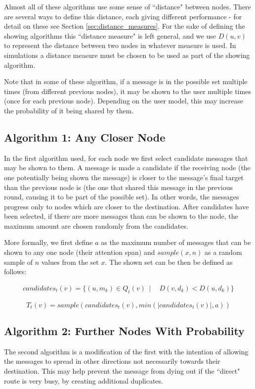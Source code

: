 \documentclass[bsc,frontabs,twoside,singlespacing,parskip,deptreport]{infthesis}     %
\begin{document}
Almost all of these algorithms use some sense of ``distance" between nodes. There are several ways to define this distance, each giving different performance - for detail on these see Section \ref{sec:distance_measures}. For the sake of defining the showing algorithms this ``distance measure" is left general, and we use $D(u, v)$ to represent the distance between two nodes in whatever measure is used. In simulations a distance measure must be chosen to be used as part of the showing algorithm.

Note that in some of these algorithm, if a message is in the possible set multiple times (from different previous nodes), it may be shown to the user multiple times (once for each previous node). Depending on the user model, this may increase the probability of it being shared by them.

\subsection{Algorithm 1: Any Closer Node}
In the first algorithm used, for each node we first select candidate messages that may be shown to them. A message is made a candidate if the receiving node (the one potentially being shown the message) is closer to the message's final target than the previous node is (the one that shared this message in the previous round, causing it to be part of the possible set). In other words, the messages progress only to nodes which are closer to the destination. After candidates have been selected, if there are more messages than can be shown to the node, the maximum amount are chosen randomly from the candidates. 

More formally, we first define $a$ as the maximum number of messages that can be shown to any one node (their attention span) and $sample(x, n)$ as a random sample of $n$ values from the set $x$. The shown set can be then be defined as follows:

\begin{equation}
\begin{split}
candidates_{t}(v) = \{ (u, m_{k}) \in Q_{t}(v) \:\: | \:\: & D(v, d_{k}) < D(u, d_{k}) \}
\end{split}
\end{equation}

\begin{equation}
T_{t}(v) = sample(candidates_{t}(v), min(|candidates_{t}(v)|, a))
\end{equation}

\subsection{Algorithm 2: Further Nodes With Probability}
The second algorithm is a modification of the first with the intention of allowing the messages to spread in other directions not necessarily towards their destination. This may help prevent the message from dying out if the ``direct" route is very busy, by creating additional duplicates.
\end{document}
